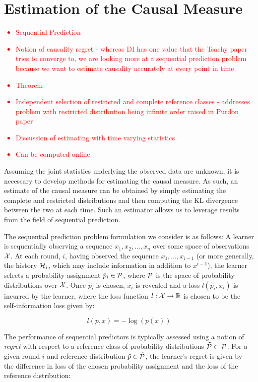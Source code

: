 \section{Estimation of the Causal Measure}

\textcolor{red}
{\begin{itemize}
    \item Sequential Prediction
    \item Notion of causality regret - whereas DI has one value that the Tsachy paper tries to converge to, we are looking more at a sequential prediction problem because we want to estimate causality accurately at every point in time
    \item Theorem
    \item Independent selection of restricted and complete reference classes - addresses problem with restricted distribution being infinite order raised in Purdon paper
    \item Discussion of estimating with time varying statistics
    \item Can be computed online
\end{itemize}}

Assuming the joint statistics underlying the observed data are unknown, it is necessary to develop methods for estimating the causal measure. As such, an estimate of the causal measure can be obtained by simply estimating the complete and restricted distributions and then computing the KL divergence between the two at each time. Such an estimator allows us to leverage results from the field of sequential prediction.

The sequential prediction problem formulation we consider is as follows: A learner is sequentially observing a sequence $x_1,x_2,\dots,x_n$ over some space of observations $\mathcal{X}$. At each round, $i$, having observed the sequence $x_1,\dots,x_{i-1}$ (or more generally, the history $\mathcal{H}_i$, which may include information in addition to $x^{i-1}$), the learner selects a probability assignment $\hat{p}_i \in \mathcal{P}$, where $\mathcal{P}$ is the space of probability distributions over $\mathcal{X}$. Once $\hat{p}_i$ is chosen, $x_i$ is revealed and a loss $l(\hat{p}_i,x_i)$ is incurred by the learner, where the loss function $l:\mathcal{X}\rightarrow \mathbb{R}$ is chosen to be the self-information loss given by:

\begin{equation}
l(p,x) = -\log(p(x))
\end{equation}

The performance of sequential predictors is typically assessed using a notion of \emph{regret} with respect to a reference class of probability distributions $\tilde{\mathcal{P}} \subset \mathcal{P}$. For a given round $i$ and reference distribution $\tilde{p} \in \tilde{\mathcal{P}}$, the learner's regret is given by the difference in loss of the chosen probability assignment and the loss of the reference distribution:


